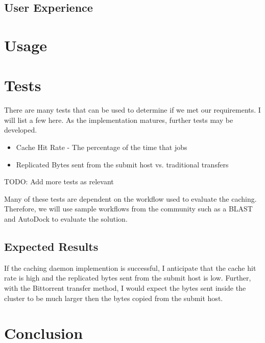 \subsection{User Experience}

\section{Usage}

\section{Tests}

There are many tests that can be used to determine if we met our requirements.  I will list a few here.  As the implementation matures, further tests may be developed.

\begin{itemize}
\item Cache Hit Rate - The percentage of the time that jobs 
\item Replicated Bytes sent from the submit host vs. traditional transfers

\end{itemize}

TODO: Add more tests as relevant

Many of these tests are dependent on the workflow used to evaluate the caching.  Therefore, we will use sample workflows from the community such as a BLAST and AutoDock to evaluate the solution.

\subsection{Expected Results}

If the caching daemon implemention is successful, I anticipate that the cache hit rate is high and the replicated bytes sent from the submit host is low.  Further, with the Bittorrent transfer method, I would expect the bytes sent inside the cluster to be much larger then the bytes copied from the submit host.

\section{Conclusion}





